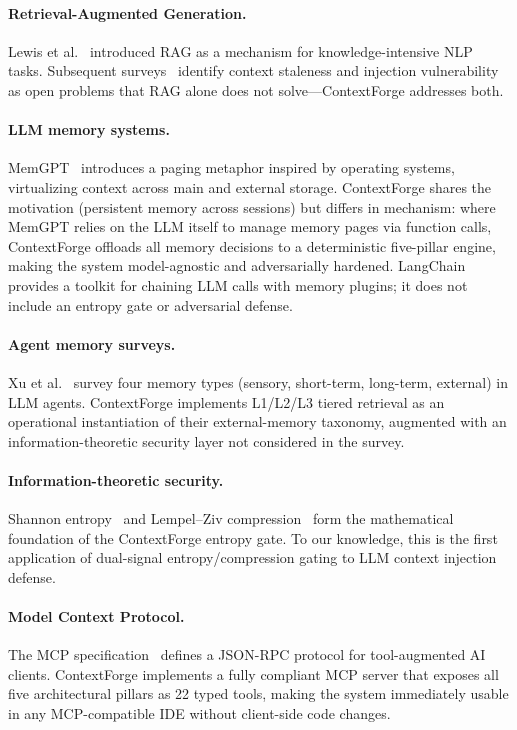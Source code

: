 \documentclass[11pt]{article}
\begin{document}
\paragraph{Retrieval-Augmented Generation.}
Lewis et al.~\cite{lewis2020rag} introduced RAG as a mechanism for
knowledge-intensive NLP tasks.  Subsequent surveys~\cite{gao2023retrieval}
identify context staleness and injection vulnerability as open problems that
RAG alone does not solve---ContextForge addresses both.

\paragraph{LLM memory systems.}
MemGPT~\cite{packer2023memgpt} introduces a paging metaphor inspired by
operating systems, virtualizing context across main and external storage.
ContextForge shares the motivation (persistent memory across sessions) but
differs in mechanism: where MemGPT relies on the LLM itself to manage memory
pages via function calls, ContextForge offloads all memory decisions to a
deterministic five-pillar engine, making the system model-agnostic and
adversarially hardened.
LangChain~\cite{chase2022langchain} provides a toolkit for chaining LLM calls
with memory plugins; it does not include an entropy gate or adversarial defense.

\paragraph{Agent memory surveys.}
Xu et al.~\cite{xu2023memory} survey four memory types (sensory, short-term,
long-term, external) in LLM agents. ContextForge implements L1/L2/L3 tiered
retrieval as an operational instantiation of their external-memory taxonomy,
augmented with an information-theoretic security layer not considered in the
survey.

\paragraph{Information-theoretic security.}
Shannon entropy~\cite{shannon1948} and Lempel--Ziv compression~\cite{ziv1977,ziv1978}
form the mathematical foundation of the ContextForge entropy gate.
To our knowledge, this is the first application of dual-signal
entropy/compression gating to LLM context injection defense.

\paragraph{Model Context Protocol.}
The MCP specification~\cite{anthropic2024mcp} defines a JSON-RPC protocol for
tool-augmented AI clients. ContextForge implements a fully compliant MCP server
that exposes all five architectural pillars as 22 typed tools, making the system
immediately usable in any MCP-compatible IDE without client-side code changes.
\end{document}
